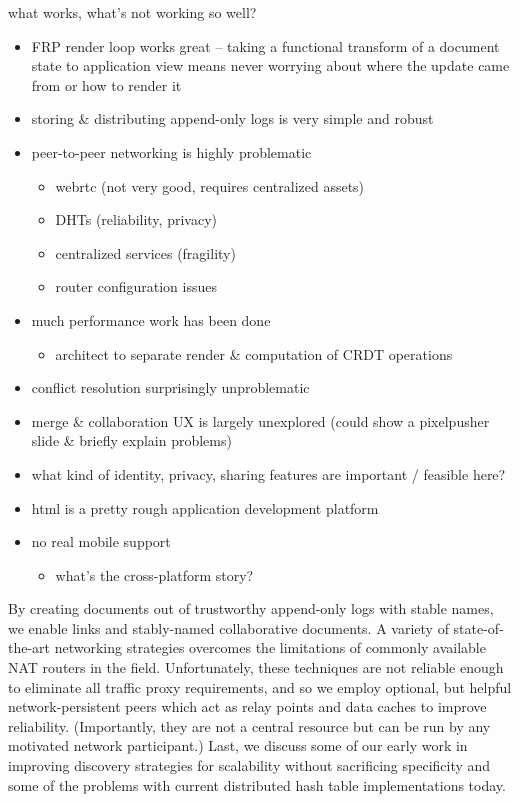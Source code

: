 \documentclass[sigplan,10pt]{acmart}
\begin{document}
what works, what's not working so well?

\begin{itemize}
    \item FRP render loop works great -- taking a functional transform of a document state to application view means never worrying about where the update came from or how to render it
	\item storing \& distributing append-only logs is very simple and robust
    \item peer-to-peer networking is highly problematic
    \begin{itemize}
	    \item webrtc (not very good, requires centralized assets)
		\item DHTs (reliability, privacy)
		\item centralized services (fragility)
		\item router configuration issues
	\end{itemize}
	\item much performance work has been done
	\begin{itemize}
	    \item architect to separate render \& computation of CRDT operations
	\end{itemize}
	\item conflict resolution surprisingly unproblematic
	\item merge \& collaboration UX is largely unexplored (could show a pixelpusher slide \& briefly explain problems)
	\item what kind of identity, privacy, sharing features are important / feasible here?
	\item html is a pretty rough application development platform
	\item no real mobile support
	\begin{itemize}
	    \item what's the cross-platform story?
	\end{itemize}
\end{itemize}

By creating documents out of trustworthy append-only logs with stable names, we enable links and stably-named collaborative documents. A variety of state-of-the-art networking strategies overcomes the limitations of commonly available NAT routers in the field. Unfortunately, these techniques are not reliable enough to eliminate all traffic proxy requirements, and so we employ optional, but helpful network-persistent peers which act as relay points and data caches to improve reliability. (Importantly, they are not a central resource but can be run by any motivated network participant.) Last, we discuss some of our early work in improving discovery strategies for scalability without sacrificing specificity and some of the problems with current distributed hash table implementations today.
\end{document}

